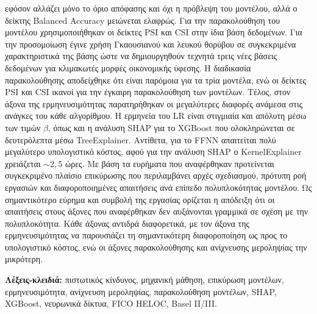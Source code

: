 εφόσον αλλάζει μόνο το όριο απόφασης και όχι η πρόβλεψη του μοντέλου, αλλά
ο δείκτης Balanced Accuracy μειώνεται ελαφρώς. Για την παρακολούθηση του
μοντέλου χρησιμοποιήθηκαν οι δείκτες PSI και CSI στην ίδια βάση δεδομένων.
Για την προσομοίωση έγινε χρήση Γκαουσιανού και λευκού θορύβου σε
συγκεκριμένα χαρακτηριστικά της βάσης ώστε να δημιουργηθούν τεχνητά τρεις
νέες βάσεις δεδομένων για κλιμακωτές μορφές οικονομικής ύφεσης. Η διαδικασία
παρακολούθησης αποδείχθηκε ότι είναι παρόμοια για τα τρία μοντέλα, ενώ οι
δείκτες PSI και CSI ικανοί για την έγκαιρη παρακολούθηση των μοντέλων. Τέλος,
στον άξονα της ερμηνευσιμότητας παρατηρήθηκαν οι μεγαλύτερες διαφορές
ανάμεσα στις ανάγκες του κάθε αλγορίθμου. Η ερμηνεία του LR είναι στιγμιαία
και απόλυτη μέσω των τιμών $\beta$, όπως και η ανάλυση SHAP για το XGBoost
που ολοκληρώνεται σε δευτερόλεπτα μέσω TreeExplainer. Αντίθετα, για το FFNN
απαιτείται πολύ μεγαλύτερο υπολογιστικό κόστος, αφού για την ανάλυση SHAP ο
KernelExplainer χρειάζεται ${\sim}2{,}5$ ώρες. Με βάση τα ευρήματα που
αναφέρθηκαν προτείνεται συγκεκριμένο πλαίσιο επικύρωσης που περιλαμβάνει
αρχές σχεδιασμού, πρότυπη ροή εργασιών και διαφοροποιημένες απαιτήσεις ανά
επίπεδο πολυπλοκότητας μοντέλου. Ως σημαντικότερο εύρημα και συμβολή της
εργασίας ορίζεται η απόδειξη ότι οι απαιτήσεις στους άξονες που αναφέρθηκαν
δεν αυξάνονται γραμμικά σε σχέση με την πολυπλοκότητα. Κάθε άξονας αντιδρά
διαφορετικά, με τον άξονα της ερμηνευσιμότητας να παρουσιάζει τη σημαντικότερη
διαφοροποίηση ως προς το υπολογιστικό κόστος, ενώ οι άξονες παρακολούθησης
και ανίχνευσης μεροληψίας την μικρότερη.

\vspace{2cm}

\noindent\textbf{Λέξεις-κλειδιά:} πιστωτικός κίνδυνος, μηχανική
μάθηση, επικύρωση μοντέλων, ερμηνευσιμότητα, ανίχνευση μεροληψίας,
παρακολούθηση μοντέλων, SHAP, XGBoost, νευρωνικά δίκτυα,
FICO HELOC, Basel II/III.

